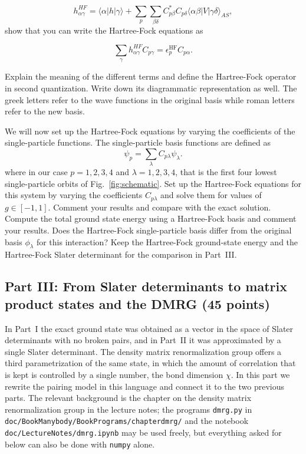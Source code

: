 \documentclass[prc]{revtex4} \usepackage[dvips]{graphicx}
\begin{document}
\begin{enumerate}
\begin{equation*}
h_{\alpha\gamma}^{HF}=\langle \alpha | h | \gamma \rangle+
\sum_{p}\sum_{\beta\delta} C^*_{p\beta}C_{p\delta}\langle \alpha\beta|V|\gamma\delta\rangle_{AS},
\end{equation*}
show that you can write the Hartree-Fock  equations as

\begin{equation*}
\sum_{\gamma}h_{\alpha\gamma}^{HF}C_{p\gamma}=\epsilon_p^{\mathrm{HF}}C_{p\alpha}.
\label{eq:newhf}
\end{equation*}

Explain the meaning of the different terms and define the Hartree-Fock
operator in second quantization. Write down its diagrammatic
representation as well.  The greek letters refer to the wave functions
in the original basis 
while roman letters refer to the new basis.


We will now set up the Hartree-Fock equations by varying the
coefficients of the single-particle functions. The single-particle
basis functions are defined as
\[
\psi_p = \sum_{\lambda} C_{p\lambda}\psi_{\lambda}.
\]
where in our case $p=1,2,3,4$ and $\lambda=1,2,3,4$, that is the first
four lowest single-particle orbits of Fig.~\ref{fig:schematic}.  Set
up the Hartree-Fock equations for this system by varying the
coefficients $C_{p\lambda}$ and solve them for values of $g\in
[-1,1]$.  Comment your results and compare with the exact
solution. Compute the total ground state energy  using a Hartree-Fock basis and comment your results.
Does the Hartree-Fock single-particle basis differ from the original
basis $\phi_\lambda$ for this interaction? Keep the Hartree-Fock
ground-state energy and the Hartree-Fock Slater determinant for the
comparison in Part~III.

\end{enumerate}

\subsection*{Part III: From Slater determinants to matrix product states and the DMRG (45 points)}

In Part~I the exact ground state was obtained as a vector in the space
of Slater determinants with no broken pairs, and in Part~II it was
approximated by a single Slater determinant. The density matrix
renormalization group offers a third parametrization of the same
state, in which the amount of correlation that is kept is controlled by
a single number, the bond dimension $\chi$. In this part we rewrite
the pairing model in this language and connect it to the two previous
parts. The relevant background is the chapter on the density matrix
renormalization group in the lecture notes; the programs
\texttt{dmrg.py} in \texttt{doc/BookManybody/BookPrograms/chapterdmrg/}
and the notebook \texttt{doc/LectureNotes/dmrg.ipynb} may be used
freely, but everything asked for below can also be done with
\texttt{numpy} alone.
\end{document}
